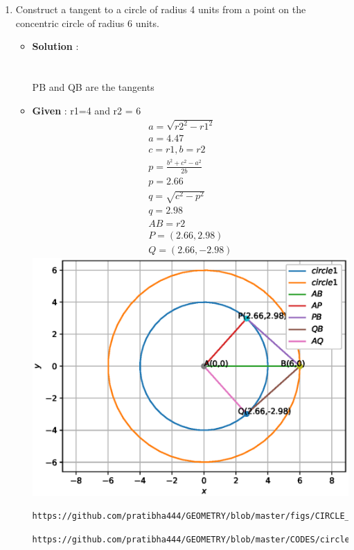 \documentclass[journal,12pt,twocolumn]{IEEEtran}
\begin{document}
\begin{enumerate}[label=\arabic*]


\item Construct a tangent to a circle of radius 4 units
from a point on the concentric circle of radius
6 units.\\
\begin{itemize}
\item\textbf{Solution} :\\\\
\\
 PB and QB are the tangents 
\item \textbf{Given} : r1=4 and r2 = 6\\
\begin{align*}
a=\sqrt{r2^2 - r1^2}\\
a=4.47\\
c=r1 , b=r2\\
p=\frac{b^2+c^2-a^2}{2b}\\
p=2.66\\
q=\sqrt{c^2 - p^2}\\
q=2.98\\
AB = r2 \\
P = (2.66,2.98)\\
Q = (2.66,-2.98)
\end{align*}
\includegraphics[scale=.4]{./figs/CIR_CON.eps}
\begin{lstlisting}
https://github.com/pratibha444/GEOMETRY/blob/master/figs/CIRCLE_CON.tex
\end{lstlisting}
\begin{lstlisting}
https://github.com/pratibha444/GEOMETRY/blob/master/CODES/circle/circon.py
\end{lstlisting}
\end{itemize}


\end{enumerate}
\end{document}
